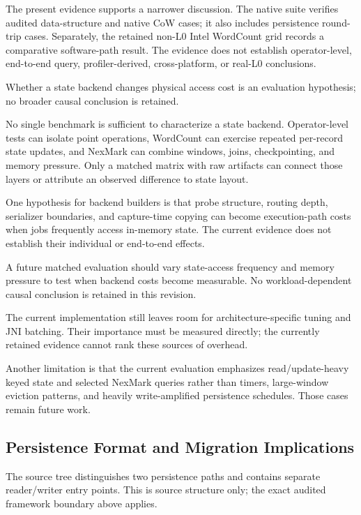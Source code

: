 \documentclass[journal]{IEEEtran}
\begin{document}
The present evidence supports a narrower discussion. The native suite verifies audited data-structure and native CoW cases; it also includes persistence round-trip cases. Separately, the retained non-L0 Intel WordCount grid records a comparative software-path result. The evidence does not establish operator-level, end-to-end query, profiler-derived, cross-platform, or real-L0 conclusions.

Whether a state backend changes physical access cost is an evaluation hypothesis; no broader causal conclusion is retained.

No single benchmark is sufficient to characterize a state backend. Operator-level tests can isolate point operations, WordCount can exercise repeated per-record state updates, and NexMark can combine windows, joins, checkpointing, and memory pressure. Only a matched matrix with raw artifacts can connect those layers or attribute an observed difference to state layout.

One hypothesis for backend builders is that probe structure, routing depth, serializer boundaries, and capture-time copying can become execution-path costs when jobs frequently access in-memory state. The current evidence does not establish their individual or end-to-end effects.

A future matched evaluation should vary state-access frequency and memory pressure to test when backend costs become measurable. No workload-dependent causal conclusion is retained in this revision.

The current implementation still leaves room for architecture-specific tuning and JNI batching. Their importance must be measured directly; the currently retained evidence cannot rank these sources of overhead.

Another limitation is that the current evaluation emphasizes read/update-heavy keyed state and selected NexMark queries rather than timers, large-window eviction patterns, and heavily write-amplified persistence schedules. Those cases remain future work.

\subsection{Persistence Format and Migration Implications}

The source tree distinguishes two persistence paths and contains separate reader/writer entry points. This is source structure only; the exact audited framework boundary above applies.
\end{document}
